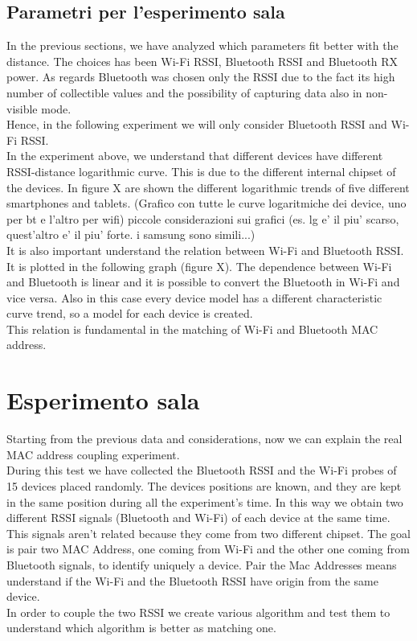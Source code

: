 \subsection{Parametri per l'esperimento sala}
In the previous sections, we have analyzed which parameters fit better with the distance. The choices has been Wi-Fi RSSI, Bluetooth RSSI and Bluetooth RX power. As regards Bluetooth was chosen only the RSSI due to the fact its high number of collectible values and the possibility of capturing data also in non-visible mode.\\
Hence, in the following experiment we will only consider Bluetooth RSSI and Wi-Fi RSSI.\\
In the experiment above, we understand that different devices have different RSSI-distance logarithmic curve. This is due to the different internal chipset of the devices. In figure X are shown the different logarithmic trends of five different smartphones and tablets. (Grafico con tutte le curve logaritmiche dei device, uno per bt e l'altro per wifi) piccole considerazioni sui grafici (es. lg e' il piu' scarso, quest'altro e' il piu' forte. i samsung sono simili...)\\
\linebreak
It is also important understand the relation between Wi-Fi and Bluetooth RSSI. It is plotted in the following graph (figure X). The dependence between Wi-Fi and Bluetooth is linear and it is possible to convert the Bluetooth in Wi-Fi and vice versa. Also in this case every device model has a different characteristic curve trend, so a model for each device is created.\\
This relation is fundamental in the matching of Wi-Fi and Bluetooth MAC address.
\section{Esperimento sala}
Starting from the previous data and considerations, now we can explain the real MAC address coupling experiment.\\
\linebreak
During this test we have collected the Bluetooth RSSI and the Wi-Fi probes of 15 devices placed randomly. The devices positions are known, and they are kept in the same position during all the experiment's time. In this way we obtain two different RSSI signals (Bluetooth and Wi-Fi) of each device at the same time. This signals aren't related because they come from two different chipset. The goal is pair two MAC Address, one coming from Wi-Fi and the other one coming from Bluetooth signals, to identify uniquely a device. Pair the Mac Addresses means understand if the Wi-Fi and the Bluetooth RSSI have origin from the same device.\\
\linebreak
In order to couple the two RSSI we create various algorithm and test them to understand which algorithm is better as matching one.

